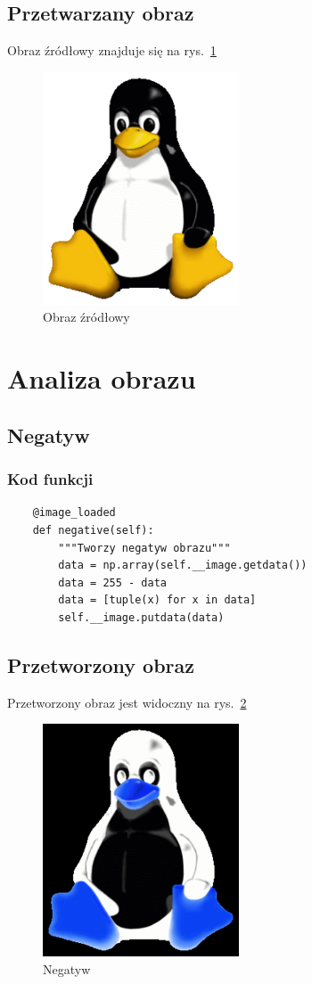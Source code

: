 \documentclass[12pt,a4paper]{article}
\begin{document}
\subsection{Przetwarzany obraz}
Obraz źródłowy znajduje się na rys.~\ref{fig:src}
\begin{figure}[h]
\includegraphics{tux}
\caption{Obraz źródłowy}
\label{fig:src}
\end{figure}
\newpage
\section{Analiza obrazu}
\subsection{Negatyw}
\subsubsection{Kod funkcji}
\begin{lstlisting}
    @image_loaded
    def negative(self):
        """Tworzy negatyw obrazu"""
        data = np.array(self.__image.getdata())
        data = 255 - data
        data = [tuple(x) for x in data]
        self.__image.putdata(data)
\end{lstlisting}
\subsection{Przetworzony obraz}
Przetworzony obraz jest widoczny na rys.~\ref{fig:neg}
\begin{figure}[h]
\includegraphics{negative}
\caption{Negatyw}
\label{fig:neg}
\end{figure}
\end{document}
